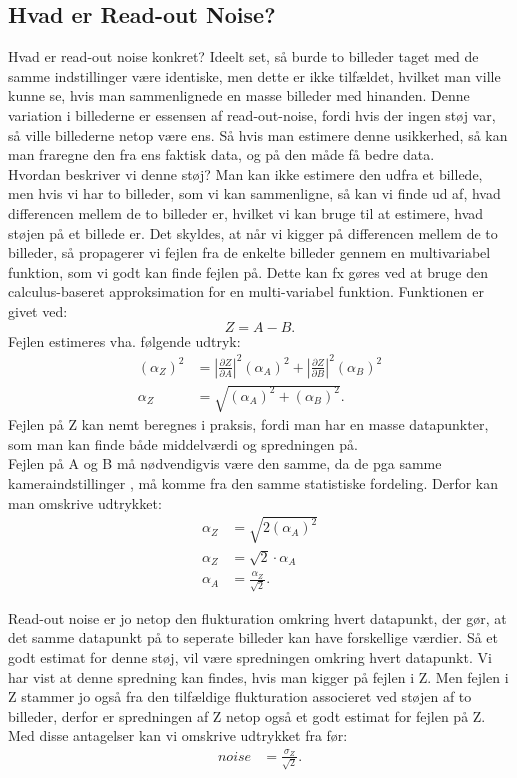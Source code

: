 \documentclass[working]{tuftebook}
\begin{document}
\subsection{Hvad er Read-out Noise?}
Hvad er read-out noise konkret? Ideelt set, så burde to billeder taget med de samme indstillinger være identiske, men dette er ikke tilfældet, hvilket man ville kunne se, hvis man sammenlignede en masse billeder med hinanden. Denne variation i billederne er essensen af read-out-noise, fordi hvis der ingen støj var, så ville billederne netop være ens. Så hvis man estimere denne usikkerhed, så kan man fraregne den fra ens faktisk data, og på den måde få bedre data. 
\\
Hvordan beskriver vi denne støj? Man kan ikke estimere den udfra et billede, men hvis vi har to billeder, som vi kan sammenligne, så kan vi finde ud af, hvad differencen mellem de to billeder er, hvilket vi kan bruge til at estimere, hvad støjen på et billede er. Det skyldes, at når vi kigger på differencen mellem de to billeder, så propagerer vi fejlen fra de enkelte billeder gennem en multivariabel funktion, som vi godt kan finde fejlen på. 
Dette kan fx gøres ved at bruge den calculus-baseret approksimation for en multi-variabel funktion. Funktionen er givet ved:
\[
Z = A - B
.\] 
Fejlen estimeres vha. følgende udtryk:
\begin{align*}
	(\alpha_Z)^2&=\left|   \frac{\partial Z}{\partial A}\right|^2(\alpha_A)^2+\left|   \frac{\partial Z}{\partial B}\right|^2(\alpha_B)^2 \\
	\alpha_Z&=\sqrt{(\alpha_A)^2+(\alpha_B)^2}
.\end{align*}
Fejlen på Z kan nemt beregnes i praksis, fordi man har en masse datapunkter, som man kan finde både middelværdi og spredningen på.
\\
Fejlen på A og B må nødvendigvis være den samme, da de pga samme kameraindstillinger , må komme fra den samme statistiske fordeling. Derfor kan man omskrive udtrykket:
\begin{align*}	
	\alpha_Z&=\sqrt{2(\alpha_A)^2} \\
	\alpha_Z&=\sqrt{2}\cdot \alpha_A \\
	\alpha_A&=\frac{\alpha_Z}{\sqrt{2}}
.\end{align*}

Read-out noise er jo netop den flukturation omkring hvert datapunkt, der gør, at det samme datapunkt på to seperate billeder kan have forskellige værdier. Så et godt estimat for denne støj, vil være spredningen omkring hvert datapunkt. Vi har vist at denne spredning kan findes, hvis man kigger på fejlen i Z. Men fejlen i Z stammer jo også fra den tilfældige flukturation associeret ved støjen af to billeder, derfor er spredningen af Z netop også et godt estimat for fejlen på Z. Med disse antagelser kan vi omskrive udtrykket fra før:
\begin{align*}
	noise&=\frac{\sigma_{Z}}{\sqrt{2}} 
.\end{align*}
\end{document}
